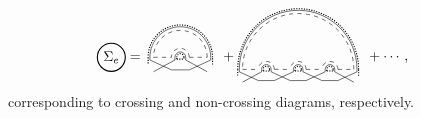 \documentclass[aps,pra,groupedaddress,twocolumn,notitlepage,superscriptaddress,10pt]{revtex4-1}
\begin{document}
\begin{align}
\tikz[baseline=-0.5ex]{
    \draw[thick] (0,0) circle (10pt) node[anchor=center] {$\Sigma_e$};
    }
=& \ \,
\tikz[scale=0.45,baseline=-0.5ex]{
    \draw[dashed] (0,0) -- (1,0);
    \draw (-0.2,0.)-- (-0.2,-0.15);
    \draw (-0.2,-0.15)-- (1.,-0.7);
    \draw (1.2,-0.15)-- (1.2,0.0);
    \draw (1.2,-0.15)-- (0,-0.8);
    \draw[densely dotted,thick] (-0.3,0.)-- (-0.3,-0.4);
    \draw[densely dotted,thick] (1.3,-0.1)-- (1.3,0.);
    \draw[dashed] (2,0) -- (3,0);
    \draw (1.8,0.)-- (1.8,-0.15);
    \draw (1.8,-0.15)-- (3.,-0.8);
    \draw (3.2,-0.15)-- (3.2,0.);
    \draw (3.2,-0.15)-- (2,-0.7);
    \draw[densely dotted,thick] (1.7,0.)-- (1.7,-0.1);
    \draw[densely dotted,thick] (3.3,-0.4)-- (3.3,0.);
    \draw[densely dotted,thick] (1.3,-0.1)--(1.7,-0.1);
    \draw (1.0,-0.7)-- (2,-0.7);
    \draw[densely dotted,thick] (3.3,0) arc (0:180:1.8);
    \draw[densely dotted,thick] (1.7,0) arc (0:180:0.2);
    \draw[dashed] (2.0,0) arc (0:180:0.5);
    \draw[dashed] (3.0,0) arc (0:180:1.5);
    \draw (1.8,0) arc (0:180:0.3);
    \draw (3.2,0) arc (0:180:1.7);
 }
\ \,
+
\tikz[scale=0.4,baseline=1.5ex]{
    \draw[dashed] (0,0) -- (1,0);
    \draw (-0.2,0.)-- (-0.2,-0.15);
    \draw (-0.2,-0.15)-- (1.,-0.7);
    \draw (1.2,-0.15)-- (1.2,0.0);
    \draw (1.2,-0.15)-- (0,-0.8);
    \draw[densely dotted,thick] (-0.3,0.)-- (-0.3,-0.4);
    \draw[densely dotted,thick] (1.3,-0.1)-- (1.3,0.);
    \draw[dashed] (2,0) -- (3,0);
    \draw (1.8,0.)-- (1.8,-0.15);
    \draw (1.8,-0.15)-- (3.,-0.7);
    \draw (3.2,-0.15)-- (3.2,0.);
    \draw (3.2,-0.15)-- (2,-0.7);
    \draw[densely dotted,thick] (1.7,0.)-- (1.7,-0.1);
    \draw[densely dotted,thick] (3.3,-0.1)-- (3.3,0.);
    \draw[dashed] (4,0) -- (5,0);
    \draw (3.8,0.)-- (3.8,-0.15);
    \draw (3.8,-0.15)-- (5.,-0.7);
    \draw (5.2,-0.15)-- (5.2,0.);
    \draw (5.2,-0.15)-- (4,-0.7);
    \draw[densely dotted,thick] (3.7,0.)-- (3.7,-0.1);
    \draw[densely dotted,thick] (5.3,-0.1)-- (5.3,0.);
    \draw[dashed] (6,0) -- (7,0);
    \draw (5.8,0.)-- (5.8,-0.15);
    \draw (5.8,-0.15)-- (7.,-0.8);
    \draw (7.2,-0.15)-- (7.2,0.);
    \draw (7.2,-0.15)-- (6,-0.7);
    \draw[densely dotted,thick] (5.7,0.)-- (5.7,-0.1);
    \draw[densely dotted,thick] (7.3,-0.4)-- (7.3,0.);
    \draw[densely dotted,thick] (1.3,-0.1)--(1.7,-0.1);
    \draw[densely dotted,thick] (3.3,-0.1)--(3.7,-0.1);
    \draw[densely dotted,thick] (5.3,-0.1)--(5.7,-0.1);
    \draw (1.0,-0.7)-- (2,-0.7);
    \draw (3.0,-0.7)-- (4,-0.7);
    \draw (5.0,-0.7)-- (6,-0.7);
    \draw[densely dotted,thick] (7.3,0) arc (0:180:3.8);
    \draw[densely dotted,thick] (1.7,0) arc (0:180:0.2);
    \draw[densely dotted,thick] (3.7,0) arc (0:180:0.2);
    \draw[densely dotted,thick] (5.7,0) arc (0:180:0.2);
    \draw[dashed] (6.0,0) arc (0:180:0.5);
    \draw[dashed] (4.0,0) arc (0:180:0.5);
    \draw[dashed] (2.0,0) arc (0:180:0.5);
    \draw[dashed] (7.0,0) arc (0:180:3.5);
    \draw (5.8,0) arc (0:180:0.3);
    \draw (3.8,0) arc (0:180:0.3);
    \draw (1.8,0) arc (0:180:0.3);
    \draw (7.2,0) arc (0:180:3.7);
 }
 \ \,
+
\cdots,
\end{align}
corresponding to crossing and non-crossing diagrams, respectively.
\end{document}
